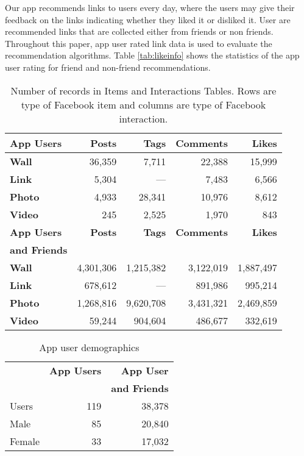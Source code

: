 Our app recommends links to users every day, where the users may give their feedback on the links indicating whether they liked it or disliked it. User are recommended
links that are collected either from friends or non friends. Throughout this paper, app user rated link data is used to evaluate the recommendation algorithms. 
Table \ref{tab:likeinfo} shows the statistics of the app user rating for friend and non-friend recommendations.
      							
 

\begin{table}
\centering
\begin{tabular}{|>{\small}l|>{\small}r|>{\small}r|>{\small}r|>{\small}r|}
\hline
\textbf{App Users} & \textbf{Posts} & \textbf{Tags} & \textbf{Comments} & \textbf{Likes} \\
\hline
\textbf{Wall} & 36,359 & 7,711 & 22,388 & 15,999 \\
\hline
\textbf{Link} & 5,304 & --- & 7,483 & 6,566 \\
\hline
\textbf{Photo} & 4,933 & 28,341 & 10,976 & 8,612 \\
\hline
\textbf{Video} & 245 & 2,525 & 1,970 & 843 \\
\hline
\hline
\textbf{App Users} & \textbf{Posts} & \textbf{Tags} & \textbf{Comments} & \textbf{Likes} \\
\textbf{and Friends} & & & & \\
\hline
\textbf{Wall} & 4,301,306 & 1,215,382 & 3,122,019 & 1,887,497 \\
\hline
\textbf{Link} & 678,612 & --- & 891,986 & 995,214 \\
\hline
\textbf{Photo} & 1,268,816 & 9,620,708 & 3,431,321 & 2,469,859 \\
\hline
\textbf{Video} & 59,244 & 904,604 & 486,677 & 332,619 \\
\hline
\end{tabular}
\caption{Number of records in Items and Interactions Tables. Rows are type of Facebook item and columns are type of Facebook interaction.}
\label{tab:interactions}
\end{table}


\begin{table}
\centering
\begin{tabular}{|>{\small}l|>{\small}r|>{\small}r|}
\hline
& \textbf{App Users} & \textbf{App User} \\
& & \textbf{and Friends} \\
\hline
Users & 119 & 38,378 \\
\hline
Male & 85 & 20,840 \\
\hline
Female & 33 & 17,032 \\
\hline
\end{tabular}
\caption{App user demographics}
\label{tab:demographics}
\end{table}

